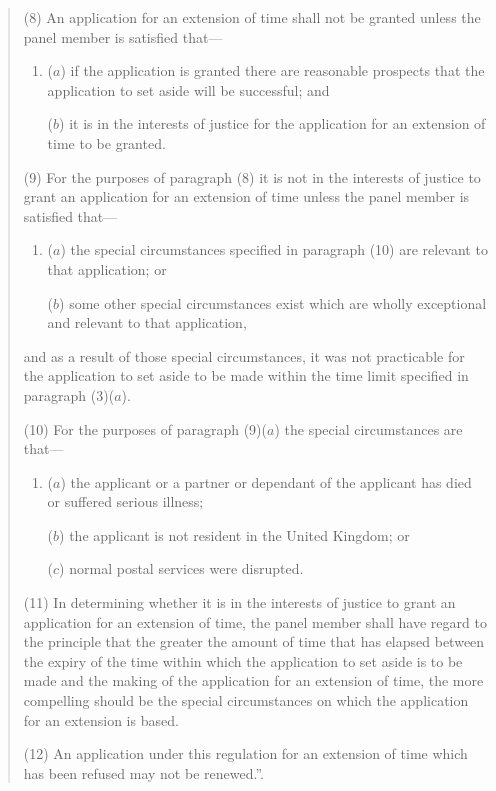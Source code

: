 \documentclass[12pt,a4paper]{article}
\begin{document}
\begin{enumerate}
\begin{quotation}
(8) An application for an extension of time shall not be granted unless the panel member is satisfied that—
\begin{enumerate}\item[]
\begin{sloppypar}
($a$) if the application is granted there are reasonable prospects that the application to set aside will be successful; and
\end{sloppypar}

($b$) it is in the interests of justice for the application for an extension of time to be granted.
\end{enumerate}

(9) For the purposes of paragraph (8) it is not in the interests of justice to grant an application for an extension of time unless the panel member is satisfied that—
\begin{enumerate}\item[]
($a$) the special circumstances specified in paragraph (10) are relevant to that application; or

($b$) some other special circumstances exist which are wholly exceptional and relevant to that application,
\end{enumerate}
and as a result of those special circumstances, it was not practicable for the application to set aside to be made within the time limit specified in paragraph (3)($a$).

(10) For the purposes of paragraph (9)($a$)  the special circumstances are that—
\begin{enumerate}\item[]
($a$) the applicant or a partner or dependant of the applicant has died or suffered serious illness;

($b$) the applicant is not resident in the United Kingdom; or

($c$) normal postal services were disrupted.
\end{enumerate}

(11) In determining whether it is in the interests of justice to grant an application for an extension of time, the panel member shall have regard to the principle that the greater the amount of time that has elapsed between the expiry of the time within which the application to set aside is to be made and the making of the application for an extension of time, the more compelling should be the special circumstances on which the application for an extension is based.

(12) An application under this regulation for an extension of time which has been refused may not be renewed.”.
\end{quotation}
\end{enumerate}
\end{document}
